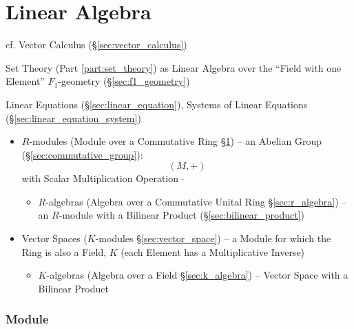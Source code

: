 \part{Linear Algebra}\label{part:linear_algebra}

\fist cf. Vector Calculus (\S\ref{sec:vector_calculus})

\fist Set Theory (Part \ref{part:set_theory}) as Linear Algebra over the
``Field with one Element'' \fist $F_1$-geometry (\S\ref{sec:f1_geometry})

\fist Linear Equations (\S\ref{sec:linear_equation}), Systems of Linear
Equations (\S\ref{sec:linear_equation_system})

\begin{itemize}
  \item $R$-modules (Module over a Commutative Ring \S\ref{sec:module}) -- an
    Abelian Group (\S\ref{sec:commutative_group}):
    \[
      (M,+)
    \]
    with Scalar Multiplication Operation $\cdot$
    \begin{itemize}
      \item $R$-algebras (Algebra over a Commutative Unital Ring
        \S\ref{sec:r_algebra}) -- an $R$-module with a Bilinear Product
        (\S\ref{sec:bilinear_product})
    \end{itemize}
  \item Vector Spaces ($K$-modules \S\ref{sec:vector_space}) -- a Module for
    which the Ring is also a Field, $K$ (each Element has a Multiplicative
    Inverse)
    \begin{itemize}
      \item $K$-algebras (Algebra over a Field \S\ref{sec:k_algebra}) -- Vector
        Space with a Bilinear Product
    \end{itemize}
\end{itemize}



\section{Module}\label{sec:module}

